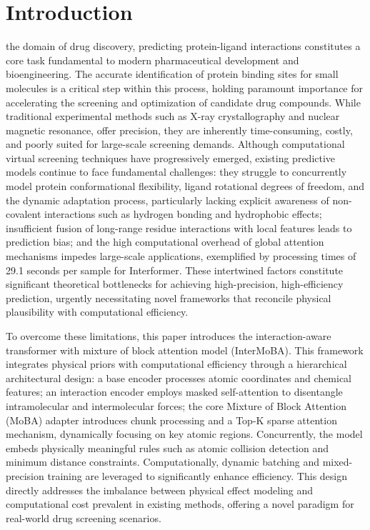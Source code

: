 \documentclass[lettersize,journal]{IEEEtran}
\begin{document}
\section{Introduction}
 the domain of drug discovery, predicting protein-ligand interactions constitutes a core task fundamental to modern pharmaceutical development\cite{wang2000calculating} and bioengineering. The accurate identification of protein binding sites for small molecules is a critical step within this process, holding paramount importance for accelerating the screening and optimization of candidate drug compounds. While traditional experimental methods  such as X-ray crystallography\cite{ladd1977structure} and nuclear magnetic resonance\cite{wuthrich1990protein}, offer precision, they are inherently time-consuming, costly, and poorly suited for large-scale screening demands. Although computational virtual screening\cite{dhakal2022artificial} techniques have progressively emerged, existing predictive models continue to face fundamental challenges\cite{wang2024prediction}\cite{harren2024modern}: they struggle to concurrently model protein conformational flexibility, ligand rotational degrees of freedom\cite{lakowicz1983rotational}, and the dynamic adaptation process, particularly lacking explicit awareness of non-covalent interactions\cite{hobza2010non} such as hydrogen bonding and hydrophobic effects; insufficient fusion of long-range residue interactions\cite{tsuboyama2023mega} with local features leads to prediction bias; and the high computational overhead of global attention mechanisms impedes large-scale applications, exemplified by processing times of 29.1 seconds per sample for Interformer\cite{lai2024interformer}. These intertwined factors constitute significant theoretical bottlenecks for achieving high-precision, high-efficiency prediction, urgently necessitating novel frameworks that reconcile physical plausibility\cite{morris2021using} with computational efficiency\cite{lu2025moba}.

To overcome these limitations, this paper introduces the interaction-aware transformer with mixture of block attention model (InterMoBA). This framework integrates physical priors with computational efficiency through a hierarchical architectural design\cite{paszke2019pytorch}: a base encoder processes atomic coordinates and chemical features\cite{xu2024surface}; an interaction encoder employs masked self-attention\cite{lee2018pre} to disentangle intramolecular and intermolecular forces; the core Mixture of Block Attention (MoBA) adapter introduces chunk processing and a Top-K\cite{lin2022survey} sparse attention mechanism, dynamically focusing on key atomic regions. Concurrently, the model embeds physically meaningful rules such as atomic collision detection and minimum distance constraints. Computationally, dynamic batching\cite{paszke2019pytorch} and mixed-precision training\cite{micikevicius2017mixed} are leveraged to significantly enhance efficiency. This design directly addresses the imbalance between physical effect modeling and computational cost prevalent in existing methods, offering a novel paradigm for real-world drug screening scenarios.
\end{document}
